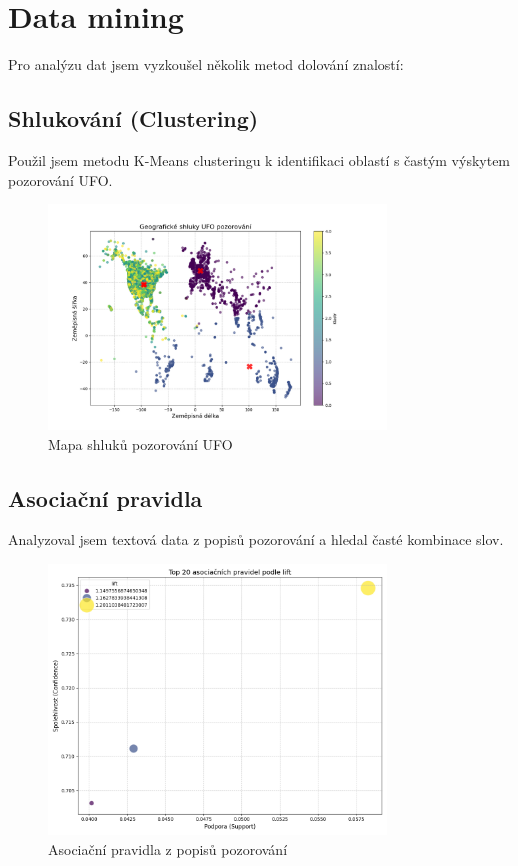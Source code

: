 \documentclass[a4paper,12pt]{article}
\begin{document}
\section{Data mining}
Pro analýzu dat jsem vyzkoušel několik metod dolování znalostí:

\subsection{Shlukování (Clustering)}
Použil jsem metodu K-Means clusteringu k identifikaci oblastí s častým výskytem pozorování UFO.

\begin{figure}[h]
\centering
\includegraphics[width=0.8\textwidth]{../images/ufo_clusters_map.png}
\caption{Mapa shluků pozorování UFO}
\end{figure}

\subsection{Asociační pravidla}
Analyzoval jsem textová data z popisů pozorování a hledal časté kombinace slov.

\begin{figure}[h]
\centering
\includegraphics[width=0.8\textwidth]{../images/ufo_association_rules.png}
\caption{Asociační pravidla z popisů pozorování}
\end{figure}
\end{document}
